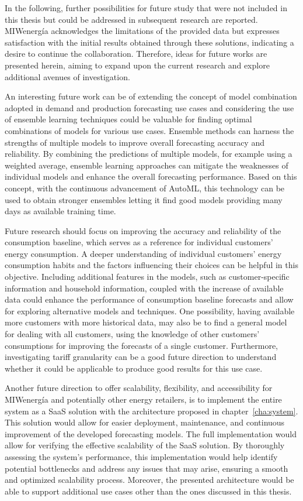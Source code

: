 In the following, further possibilities for future study that were not included in this thesis but could be addressed in subsequent research are reported.
MIWenergía acknowledges the limitations of the provided data but expresses satisfaction with the initial results obtained through these solutions, indicating a desire to continue the collaboration.
Therefore, ideas for future works are presented herein, aiming to expand upon the current research and explore additional avenues of investigation.

An interesting future work can be of extending the concept of model combination adopted in demand and production forecasting use cases and considering the use of ensemble learning techniques could be valuable for finding optimal combinations of models for various use cases.
Ensemble methods can harness the strengths of multiple models to improve overall forecasting accuracy and reliability.
By combining the predictions of multiple models, for example using a weighted average, ensemble learning approaches can mitigate the weaknesses of individual models and enhance the overall forecasting performance.
Based on this concept, with the continuous advancement of AutoML, this technology can be used to obtain stronger ensembles letting it find good models providing many days as available training time.

Future research should focus on improving the accuracy and reliability of the consumption baseline, which serves as a reference for individual customers' energy consumption.
A deeper understanding of individual customers' energy consumption habits and the factors influencing their choices can be helpful in this objective.
Including additional features in the models, such as customer-specific information and household information, coupled with the increase of available data could enhance the performance of consumption baseline forecasts and allow for exploring alternative models and techniques.
One possibility, having available more customers with more historical data, may also be to find a general model for dealing with all customers, using the knowledge of other customers' consumptions for improving the forecasts of a single customer.
Furthermore, investigating tariff granularity can be a good future direction to understand whether it could be applicable to produce good results for this use case.

Another future direction to offer scalability, flexibility, and accessibility for MIWenergía and potentially other energy retailers, is to implement the entire system as a SaaS solution with the architecture proposed in chapter~\ref{cha:system}.
This solution would allow for easier deployment, maintenance, and continuous improvement of the developed forecasting models.
The full implementation would allow for verifying the effective scalability of the SaaS solution.
By thoroughly assessing the system's performance, this implementation would help identify potential bottlenecks and address any issues that may arise, ensuring a smooth and optimized scalability process.
Moreover, the presented architecture would be able to support additional use cases other than the ones discussed in this thesis.

